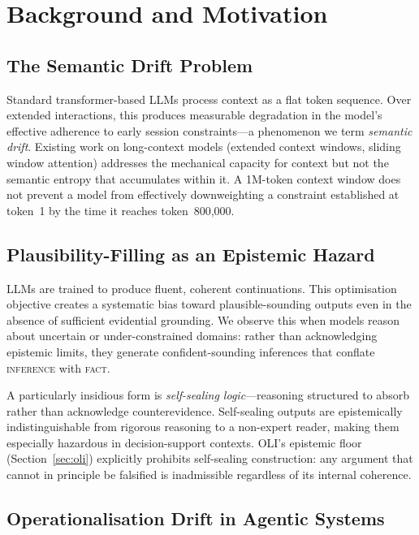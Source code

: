 \documentclass[11pt,a4paper]{article}
\begin{document}
\section{Background and Motivation}
\label{sec:background}

\subsection{The Semantic Drift Problem}
\label{sec:drift}

Standard transformer-based LLMs process context as a flat token sequence.
Over extended interactions, this produces measurable degradation in the model's effective adherence to early session constraints---a phenomenon we term \emph{semantic drift}.
Existing work on long-context models (extended context windows, sliding window attention) addresses the mechanical capacity for context but not the semantic entropy that accumulates within it.
A 1M-token context window does not prevent a model from effectively downweighting a constraint established at token~1 by the time it reaches token~800{,}000.

\subsection{Plausibility-Filling as an Epistemic Hazard}
\label{sec:plausibility}

LLMs are trained to produce fluent, coherent continuations.
This optimisation objective creates a systematic bias toward plausible-sounding outputs even in the absence of sufficient evidential grounding.
We observe this when models reason about uncertain or under-constrained domains: rather than acknowledging epistemic limits, they generate confident-sounding inferences that conflate \textsc{inference} with \textsc{fact}.

A particularly insidious form is \emph{self-sealing logic}---reasoning structured to absorb rather than acknowledge counterevidence.
Self-sealing outputs are epistemically indistinguishable from rigorous reasoning to a non-expert reader, making them especially hazardous in decision-support contexts.
OLI's epistemic floor (Section~\ref{sec:oli}) explicitly prohibits self-sealing construction: any argument that cannot in principle be falsified is inadmissible regardless of its internal coherence.

\subsection{Operationalisation Drift in Agentic Systems}
\label{sec:l4drift}
\end{document}
